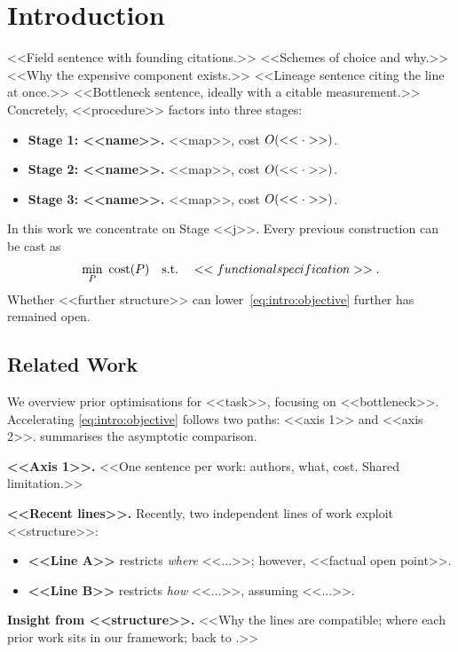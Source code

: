 \section{Introduction}\label{sec:intro}
<<Field sentence with founding citations.>> <<Schemes of choice and why.>>
<<Why the expensive component exists.>> <<Lineage sentence citing the line at once.>>
<<Bottleneck sentence, ideally with a citable measurement.>>
Concretely, <<procedure>> factors into three stages:
\begin{itemize}
\item \textbf{Stage 1: <<name>>.} <<map>>, cost $O(<<\cdot>>)$.
\item \textbf{Stage 2: <<name>>.} <<map>>, cost $O(<<\cdot>>)$.
\item \textbf{Stage 3: <<name>>.} <<map>>, cost $O(<<\cdot>>)$.
\end{itemize}
In this work we concentrate on Stage <<j>>. Every previous construction can be cast as
\begin{equation}\label{eq:intro:objective}
  \min_{P}\ \operatorname{cost}(P) \quad \text{s.t.}\quad <<functional specification>>.
\end{equation}
Whether <<further structure>> can lower~\eqref{eq:intro:objective} further has remained open.

\subsection{Related Work}\label{sec:related}
We overview prior optimisations for <<task>>, focusing on <<bottleneck>>. Accelerating
\eqref{eq:intro:objective} follows two paths: <<axis 1>> and <<axis 2>>.
 summarises the asymptotic comparison.


\noindent\textbf{<<Axis 1>>.} <<One sentence per work: authors, what, cost. Shared limitation.>>

\noindent\textbf{<<Recent lines>>.} Recently, two independent lines of work exploit <<structure>>:
\begin{itemize}
\item \textbf{<<Line A>>} restricts \emph{where} <<...>>; however, <<factual open point>>.
\item \textbf{<<Line B>>} restricts \emph{how} <<...>>, assuming <<...>>.
\end{itemize}

\noindent\textbf{Insight from <<structure>>.} <<Why the lines are compatible; where each
prior work sits in our framework; back to .>>


